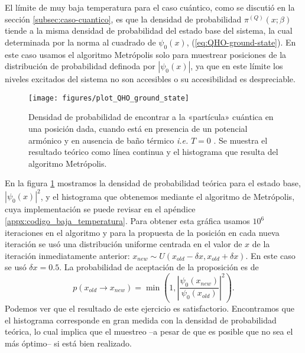 \documentclass[%
 reprint,
 amsmath,amssymb,
 aps,
 pra,
]{revtex4-2}
\begin{document}
El límite de muy baja temperatura para el caso cuántico, como se discutió en la sección \ref{subsec:caso-cuantico}, es que la densidad de probabilidad $\pi^{(Q)}(x;\beta)$ tiende a la misma densidad de probabilidad del estado base del sistema, la cual determinada por la norma al cuadrado de $\psi_0(x)$, (\ref{eq:QHO-ground-state}). En este caso usamos el algoritmo Metrópolis solo para muestrear posiciones de la distribución de probabilidad definoda por $|\psi_0(x)|$, ya que en este límite los niveles excitados del sistema no son accesibles o su accesibilidad es despreciable. 

\begin{figure}[!t]
	\centering
	\texttt{[image: figures/plot\_QHO\_ground\_state]}
	\caption{Densidad de probabilidad de encontrar a la «partícula» cuántica en una posición dada, cuando está en presencia de un potencial armónico y en ausencia de baño térmico \textit{i.e.} $T=0$ . Se muestra el resultado teórico como línea continua y el histograma que resulta del algoritmo Metrópolis.}
	\label{fig:ground_state}
\end{figure}

En la figura \ref{fig:ground_state} mostramos la densidad de probabilidad teórica para el estado base, $|\psi_0(x)|^2$, y el histograma que obtenemos mediante el algoritmo de Metrópolis, cuya implementación se puede revisar en el apéndice \ref{appx:codigo_baja_temperatura}. Para obtener esta gráfica usamos $10^6$ iteraciones en el algoritmo y para la propuesta de la posición en cada nueva iteración se usó una distribución uniforme centrada en el valor de $x$ de la iteración inmediatamente anterior: $x_{new} \sim U(x_{old} - \delta x, x_{old} + \delta x)$. En este caso se usó $\delta x = 0.5$. La probabilidad de aceptación de la proposición es de
\begin{equation}
	p(x_{old} \rightarrow x_{new}) = \min\left(1,\left|\frac{\psi_{0}(x_{new})}{\psi_{0}(x_{old})}\right|^2\right).
\end{equation}
Podemos ver que el resultado de este ejercicio es satisfactorio. Encontramos que el histograma corresponde en gran medida con la densidad de probabilidad teórica, lo cual implica que el muestreo –a pesar de que es posible que no sea el más óptimo– si está bien realizado.
\end{document}
